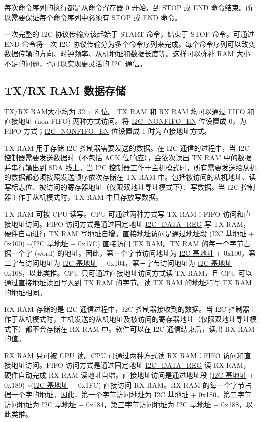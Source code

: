 \documentclass[main\_\_CN.tex]{subfiles}
\begin{document}
每次命令序列的执行都是从命令寄存器 0 开始，到 STOP 或 END 命令结束。所以需要保证每个命令序列中必须有 STOP 或 END 命令。

一次完整的 I2C 协议传输应该起始于 START 命令，结束于 STOP 命令。可通过 END 命令将一次 I2C 协议传输分为多个命令序列来完成。每个命令序列可以改变数据传输的方向、时钟频率、从机地址和数据长度等。这样可以弥补 RAM 大小不足的问题，也可以实现更灵活的 I2C 通信。

\subsection{TX/RX RAM 数据存储}\label{subsubsec:i2c-txrx}
TX/RX RAM大小均为 32 × 8 位。 TX RAM 和 RX RAM 均可以通过 FIFO 和直接地址 (non-FIFO) 两种方式访问。将 \hyperref[fielddesc:I2CNONFIFOEN]{I2C\_NONFIFO\_EN} 位设置成 0，为 FIFO 方式；\hyperref[fielddesc:I2CNONFIFOEN]{I2C\_NONFIFO\_EN} 位设置成 1 时为直接地址方式。

TX RAM 用于存储 I2C 控制器需要发送的数据。在 I2C 通信的过程中，当 I2C 控制器需要发送数据时（不包括 ACK 位响应），会依次读出 TX RAM 中的数据并串行输出到 SDA 线上。当 I2C 控制器工作于主机模式时，所有需要发送给从机的数据都必须按照发送顺序依次存储在 TX RAM 中。包括被访问的从机地址、读写标志位、被访问的寄存器地址（仅限双地址寻址模式下）、写数据。当 I2C 控制器工作于从机模式时，TX RAM 中只存放写数据。

TX RAM 可被 CPU 读写。CPU 可通过两种方式写 TX RAM：FIFO 访问和直接地址访问。FIFO 访问方式是通过固定地址 \hyperref[regdesc:I2CDATAREG]{I2C\_DATA\_REG} 写 TX RAM，硬件自动进行 TX RAM 写地址自增。直接地址访问是通过地址段 (\hyperref[tab:sysmem-base-address]{I2C 基地址} + 0x100) \textasciitilde (\hyperref[tab:sysmem-base-address]{I2C 基地址} + 0x17C) 直接访问 TX RAM。TX RAM 的每一个字节占据一个字 (word) 的地址。因此，第一个字节访问地址为 \hyperref[tab:sysmem-base-address]{I2C 基地址} + 0x100，第二字节访问地址为 \hyperref[tab:sysmem-base-address]{I2C 基地址} + 0x104，第三字节访问地址为 \hyperref[tab:sysmem-base-address]{I2C 基地址} + 0x108，以此类推。CPU 只可通过直接地址访问方式读 TX RAM，且 CPU 可以通过直接地址读回写入到 TX RAM 的字节。读 TX RAM 的地址和写 TX RAM 的地址相同。

RX RAM 存储的是 I2C 通信过程中，I2C 控制器接收到的数据。当 I2C 控制器工作于从机模式时，主机发送的从机地址及被访问的寄存器地址（仅限双地址寻址模式下）都不会存储在 RX RAM 中。软件可以在 I2C 通信结束后，读出 RX RAM 的值。


RX RAM 只可被 CPU 读。CPU 可通过两种方式读 RX RAM：FIFO 访问和直接地址访问。FIFO 访问方式是通过固定地址 \hyperref[regdesc:I2CDATAREG]{I2C\_DATA\_REG} 读 RX RAM，硬件自动完成 RX RAM 读地址自增。直接地址访问是通过地址段 (\hyperref[tab:sysmem-base-address]{I2C 基地址} + 0x180) \textasciitilde (\hyperref[tab:sysmem-base-address]{I2C 基地址} + 0x1FC) 直接访问 RX RAM。RX RAM 的每一个字节占据一个字的地址。因此，第一个字节访问地址为 \hyperref[tab:sysmem-base-address]{I2C 基地址} + 0x180，第二字节访问地址为 \hyperref[tab:sysmem-base-address]{I2C 基地址} + 0x184，第三字节访问地址为 \hyperref[tab:sysmem-base-address]{I2C 基地址} + 0x188，以此类推。
\end{document}
